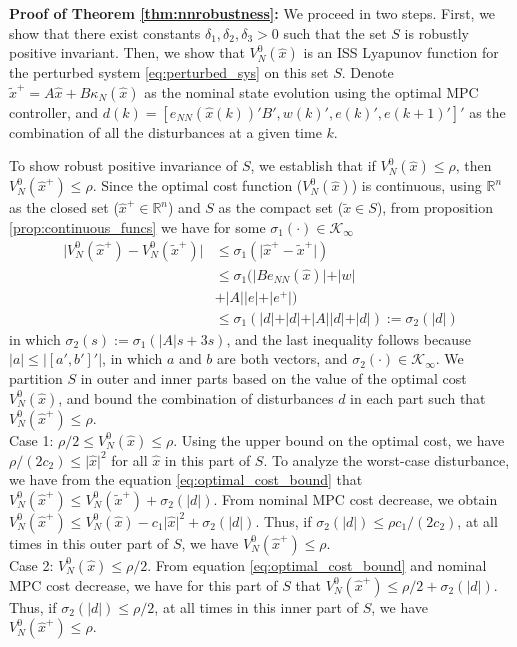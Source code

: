 \documentclass[preprint,5p, twocolumn, authoryear]{elsarticle}
\newcommand{\bbR}{\mathbb{R}}
\begin{document}
\textbf{Proof of Theorem \ref{thm:nnrobustness}:}
We proceed in two steps. First, 
we show that there exist constants $\delta_1, \delta_2, \delta_3 > 0$
such that the set $S$ is robustly positive invariant. Then, we 
show that $V_N^0(\hat{x})$ is an ISS Lyapunov function for 
the perturbed system \eqref{eq:perturbed_sys} on this set $S$. Denote 
$\tilde{x}^+ = A\hat{x} + B\kappa_N(\hat{x})$ as the nominal 
state evolution using the optimal MPC controller, 
and $d(k) = [ e_{NN}(\hat{x}(k))'B', w(k)', e(k)', e(k+1)']'$
as the combination of all the disturbances at a given time $k$. 

To show robust positive invariance of $S$,  
we establish that if $V_N^0(\hat{x}) \leq \rho$, 
then $V_N^0(\hat{x}^+) \leq \rho$.
Since the optimal 
cost function ($V_N^0(\hat{x})$) is continuous,
using $\bbR^n$ as the closed set ($\hat{x}^+ \in \bbR^n$) 
and $S$ as the compact set ($\tilde{x} \in S$),
from proposition \ref{prop:continuous_funcs} we have
for some $\sigma_1(\cdot) \in \mathcal{K}_{\infty}$
\begin{align}
    \vert V_N^0(\hat{x}^+) - V_N^0(\tilde{x}^+) \vert &\leq 
    \sigma_1(\vert \hat{x}^+ - \tilde{x}^+ \vert)  \nonumber  \\
    &\leq 
   \sigma_1(\vert B e_{NN}(\hat{x}) \vert + \vert w \vert 
   \nonumber \\
   & + \vert A\vert\vert e \vert +  \vert e^+ \vert) \nonumber \\
     &\leq 
   \sigma_1(\vert d \vert + \vert d \vert + \vert A \vert\vert d \vert + \vert d \vert) := \sigma_2(\vert d \vert)
   \label{eq:optimal_cost_bound}
\end{align}
in which $\sigma_2(s) := \sigma_1(\vert A\vert s +3s)$, and the last inequality 
follows because $\vert a \vert \leq \vert [a', b']' \vert$, in which $a$ and $b$
are both vectors, and $\sigma_2(\cdot) \in \mathcal{K}_{\infty}$.
We partition $S$ in outer and inner parts based on 
the value of the optimal cost $V_N^0(\hat{x})$, and bound the 
combination of disturbances $d$ in each part 
such that $V_N^0(\hat{x}^+) \leq \rho$. \\
Case 1: $\rho/2 \leq V_N^0(\hat{x}) \leq \rho $. Using the 
upper bound on the optimal cost, we have 
$\rho/(2c_2) \leq \vert \hat{x} \vert^2$ for all $\hat{x}$ 
in this part of $S$. To analyze the worst-case disturbance, 
we have from the equation \eqref{eq:optimal_cost_bound} that 
$V_N^0(\hat{x}^+) \leq V_N^0(\tilde{x}^+) + \sigma_2(\vert d \vert) $.
From nominal MPC cost decrease, we obtain  
$V_N^0(\hat{x}^+) \leq V_N^0(\hat{x}) - c_1\vert \hat{x} \vert^2 + \sigma_2(\vert d \vert)$. Thus, if $\sigma_2(\vert d \vert) \leq \rho c_1/(2c_2)$, 
at all times in this outer part of $S$, we have 
$V_N^0(\hat{x}^+) \leq \rho$. \\
Case 2: $V_N^0(\hat{x}) \leq \rho/2 $. From 
equation \eqref{eq:optimal_cost_bound} and nominal MPC 
cost decrease, we have for this part of $S$ that 
$V_N^0(\hat{x}^+) \leq \rho/2 + \sigma_2(\vert d \vert)$.
Thus, if $\sigma_2(\vert d \vert) \leq \rho/2$, 
at all times in this inner part of $S$, we have 
$V_N^0(\hat{x}^+) \leq \rho$.
\end{document}
